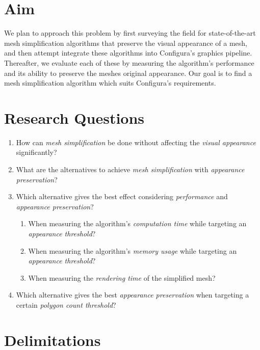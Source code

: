 \section{Aim}
\label{sec:aim}

We plan to approach this problem by first surveying the field for state-of-the-art mesh simplification algorithms that preserve the visual appearance of a mesh, and then attempt integrate these algorithms into Configura's graphics pipeline. Thereafter, we evaluate each of these by measuring the algorithm's performance and its ability to preserve the meshes original appearance. Our goal is to find a mesh simplification algorithm which suits Configura's requirements.

\section{Research Questions}
\label{sec:research-questions}

\begin{enumerate}
\item How can \emph{mesh simplification} be done without affecting the \emph{visual appearance} significantly?

\item What are the alternatives to achieve \emph{mesh simplification} with \emph{appearance preservation}?

\item{Which alternative gives the best effect considering \emph{performance} and  \emph{appearance preservation}?
  \begin{enumerate}
  \item When measuring the algorithm's \emph{computation time} while targeting an \emph{appearance threshold}?
  \item When measuring the algorithm's \emph{memory usage} while targeting an \emph{appearance threshold}?
  \item When measuring the \emph{rendering time} of the simplified mesh? 
  \end{enumerate}
}
\item Which alternative gives the best \emph{appearance preservation} when targeting a certain \emph{polygon count threshold}?
\end{enumerate}


\section{Delimitations}
\label{sec:delimitations}

